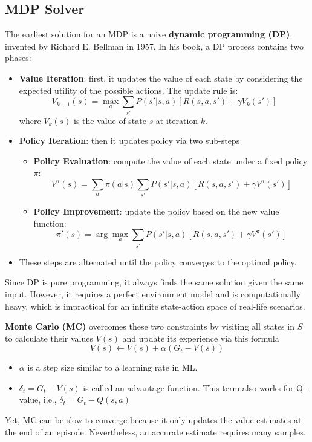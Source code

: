 \documentclass[../main.tex]{subfiles}
\begin{document}
\subsection{MDP Solver} \label{sec:mdp_solutions}
The earliest solution for an MDP is a naive \textbf{dynamic programming (DP)}, invented by Richard E. Bellman \cite{rlbible_mdp} in 1957. In his book, a DP process contains two phases:
\begin{itemize}
    \item \textbf{Value Iteration}: first, it updates the value of each state by considering the expected utility of the possible actions. The update rule is:
    \[
    V_{k+1}(s) = \max_a \sum_{s'} P(s'|s, a) \left[ R(s, a, s') + \gamma V_k(s') \right]
    \]
    where \( V_k(s) \) is the value of state \( s \) at iteration \( k \).
    \item \textbf{Policy Iteration}: then it updates policy via two sub-steps
    \begin{itemize}
        \item \textbf{Policy Evaluation}: compute the value of each state under a fixed policy \( \pi \):
        \[
        V^\pi(s) = \sum_{a} \pi(a|s) \sum_{s'} P(s'|s, a) \left[ R(s, a, s') + \gamma V^\pi(s') \right]
        \]
        \item \textbf{Policy Improvement}: update the policy based on the new value function:
        \[
        \pi'(s) = \arg\max_a \sum_{s'} P(s'|s, a) \left[ R(s, a, s') + \gamma V^\pi(s') \right]
        \]
    \end{itemize}
    \item These steps are alternated until the policy converges to the optimal policy. 
\end{itemize}
Since DP is pure programming, it always finds the same solution given the same input. However, it requires a perfect environment model and is computationally heavy, which is impractical for an infinite state-action space of real-life scenarios.

\textbf{Monte Carlo (MC)} overcomes these two constraints by visiting all states in $S$ to calculate their values $V(s)$ and update its experience via this formula 
\begin{equation}
    V(s) \leftarrow V(s) + \alpha (G_t - V(s))
    \label{eq:montecarlo}
\end{equation}
\begin{itemize}
    \item $\alpha$ is a step size similar to a learning rate in ML.
    \item $\delta_t = G_t - V(s)$ is called an advantage function. This term also works for Q-value, i.e., $\delta_t = G_t - Q(s, a)$
\end{itemize}
 Yet, MC can be slow to converge because it only updates the value estimates at the end of an episode. Nevertheless, an accurate estimate requires many samples.
\end{document}
